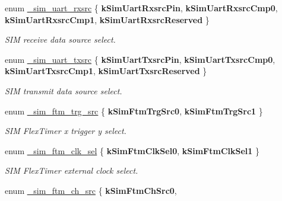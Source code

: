 \begin{DoxyCompactItemize}
enum \hyperlink{group__sim__hal_gaeb8ae2e1a56a4095cc8a137be3760917}{\+\_\+sim\+\_\+uart\+\_\+rxsrc} \{ {\bfseries k\+Sim\+Uart\+Rxsrc\+Pin}, 
{\bfseries k\+Sim\+Uart\+Rxsrc\+Cmp0}, 
{\bfseries k\+Sim\+Uart\+Rxsrc\+Cmp1}, 
{\bfseries k\+Sim\+Uart\+Rxsrc\+Reserved}
 \}\hypertarget{group__sim__hal_gaeb8ae2e1a56a4095cc8a137be3760917}{}\label{group__sim__hal_gaeb8ae2e1a56a4095cc8a137be3760917}
\begin{DoxyCompactList}\small\item\em S\+IM receive data source select. \end{DoxyCompactList}
\item 
enum \hyperlink{group__sim__hal_gac2baf3c3f9f2c2cb016fd88de79a400b}{\+\_\+sim\+\_\+uart\+\_\+txsrc} \{ {\bfseries k\+Sim\+Uart\+Txsrc\+Pin}, 
{\bfseries k\+Sim\+Uart\+Txsrc\+Cmp0}, 
{\bfseries k\+Sim\+Uart\+Txsrc\+Cmp1}, 
{\bfseries k\+Sim\+Uart\+Txsrc\+Reserved}
 \}\hypertarget{group__sim__hal_gac2baf3c3f9f2c2cb016fd88de79a400b}{}\label{group__sim__hal_gac2baf3c3f9f2c2cb016fd88de79a400b}
\begin{DoxyCompactList}\small\item\em S\+IM transmit data source select. \end{DoxyCompactList}
\item 
enum \hyperlink{group__sim__hal_ga8f96c79e1fb5ece73bc80a330714de84}{\+\_\+sim\+\_\+ftm\+\_\+trg\+\_\+src} \{ {\bfseries k\+Sim\+Ftm\+Trg\+Src0}, 
{\bfseries k\+Sim\+Ftm\+Trg\+Src1}
 \}\hypertarget{group__sim__hal_ga8f96c79e1fb5ece73bc80a330714de84}{}\label{group__sim__hal_ga8f96c79e1fb5ece73bc80a330714de84}
\begin{DoxyCompactList}\small\item\em S\+IM Flex\+Timer x trigger y select. \end{DoxyCompactList}
\item 
enum \hyperlink{group__sim__hal_ga5edbf6726ed48c8c0973f02fb20eb224}{\+\_\+sim\+\_\+ftm\+\_\+clk\+\_\+sel} \{ {\bfseries k\+Sim\+Ftm\+Clk\+Sel0}, 
{\bfseries k\+Sim\+Ftm\+Clk\+Sel1}
 \}\hypertarget{group__sim__hal_ga5edbf6726ed48c8c0973f02fb20eb224}{}\label{group__sim__hal_ga5edbf6726ed48c8c0973f02fb20eb224}
\begin{DoxyCompactList}\small\item\em S\+IM Flex\+Timer external clock select. \end{DoxyCompactList}
\item 
enum \hyperlink{group__sim__hal_ga1fbcdea9dba7be70b6f169af27855bba}{\+\_\+sim\+\_\+ftm\+\_\+ch\+\_\+src} \{ {\bfseries k\+Sim\+Ftm\+Ch\+Src0}, 

\end{DoxyCompactItemize}
